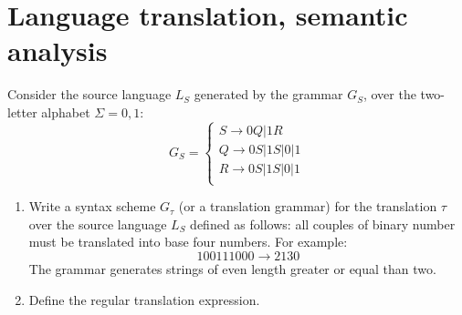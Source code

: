 \section{Language translation, semantic analysis}

Consider the source language $L_S$ generated by the grammar $G_S$, over the two-letter alphabet $\Sigma= {0,1}$:
\[G_S=\begin{cases}
    S \rightarrow 0Q|1R     \\
    Q \rightarrow 0S|1S|0|1 \\
    R \rightarrow 0S|1S|0|1 \\
\end{cases}\]
\begin{enumerate}
    \item Write a syntax scheme $G_{\tau}$ (or a translation grammar) for the translation $\tau$ over the source language $L_S$ defined as follows: 
        all couples of binary number must be translated into base four numbers. For example: 
        \[100111000 \rightarrow 2130\]
        The grammar generates strings of even length greater or equal than two. 
    \item Define the regular translation expression.
\end{enumerate}

